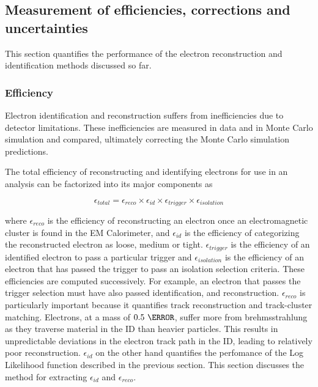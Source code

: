 \subsection{Measurement of efficiencies, corrections and uncertainties}
\label{sec:eleCorr}
\par This section quantifies the performance of the electron reconstruction and identification methods 
discussed so far. 

\subsubsection{Efficiency}
\par Electron identification and reconstruction suffers from inefficiencies due 
to detector limitations. These inefficiencies are measured in data and in Monte Carlo 
simulation and compared, ultimately correcting the Monte Carlo simulation predictions. 

\par The total efficiency of reconstructing and identifying electrons for use in an 
analysis can be factorized into its major components as  

\begin{equation}
\epsilon_{total} = \epsilon_{reco} \times \epsilon_{id} \times \epsilon_{trigger} \times \epsilon_{isolation}
\end{equation}

where $\epsilon_{reco}$ is the efficiency of reconstructing an electron once an 
electromagnetic cluster is found in the EM Calorimeter, and $\epsilon_{id}$ is the 
efficiency of categorizing the reconstructed electron as loose, medium or tight.
$\epsilon_{trigger}$ is the efficiency of an identified electron to pass a particular 
trigger and $\epsilon_{isolation}$ is the efficiency of an electron that has passed the trigger 
to pass an isolation selection criteria. These efficiencies are computed successively. For example, 
an electron that passes the trigger selection must have also passed identification, and 
reconstruction. $\epsilon_{reco}$ is particularly 
important because it quantifies track reconstruction and track-cluster matching. 
Electrons, at a mass of $0.5~\MeV$, suffer more from brehmsstrahlung as they 
traverse material in the ID than heavier particles. This results in unpredictable 
deviations in the electron track path in the ID, leading to relatively 
poor reconstruction. $\epsilon_{id}$ on the other hand quantifies the perfomance 
of the Log Likelihood function described in the previous section. This section 
discusses the method for extracting $\epsilon_{id}$ and $\epsilon_{reco}$. 

